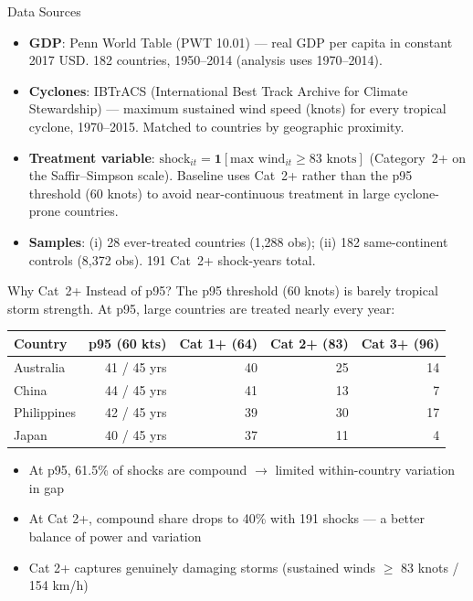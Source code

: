 \documentclass[aspectratio=169,c]{beamer}
\begin{document}
\begin{frame}{Data Sources}
\begin{itemize}
  \item \textbf{GDP}: Penn World Table (PWT 10.01) --- real GDP per capita in constant 2017 USD. 182 countries, 1950--2014 (analysis uses 1970--2014).

  \medskip
  \item \textbf{Cyclones}: IBTrACS (International Best Track Archive for Climate Stewardship) --- maximum sustained wind speed (knots) for every tropical cyclone, 1970--2015. Matched to countries by geographic proximity.

  \medskip
  \item \textbf{Treatment variable}: $\mathrm{shock}_{it} = \mathbf{1}[\text{max wind}_{it} \geq 83 \text{ knots}]$ (Category~2+ on the Saffir--Simpson scale). Baseline uses Cat~2+ rather than the p95 threshold (60 knots) to avoid near-continuous treatment in large cyclone-prone countries.

  \medskip
  \item \textbf{Samples}: (i) 28 ever-treated countries (1,288 obs); (ii) 182 same-continent controls (8,372 obs). 191 Cat~2+ shock-years total.
\end{itemize}
\end{frame}

\begin{frame}{Why Cat~2+ Instead of p95?}
The p95 threshold (60 knots) is barely tropical storm strength. At p95, large countries are treated nearly every year:

\centering
\smallskip
\begin{tabular}{l r r r r}
\hline
\textbf{Country} & \textbf{p95 (60 kts)} & \textbf{Cat 1+ (64)} & \textbf{Cat 2+ (83)} & \textbf{Cat 3+ (96)} \\
\hline
Australia    & 41 / 45 yrs & 40 & 25 & 14 \\
China        & 44 / 45 yrs & 41 & 13 & 7  \\
Philippines  & 42 / 45 yrs & 39 & 30 & 17 \\
Japan        & 40 / 45 yrs & 37 & 11 & 4  \\
\hline
\end{tabular}

\smallskip
\small
\begin{itemize}
  \item At p95, 61.5\% of shocks are compound $\to$ limited within-country variation in gap
  \item At Cat 2+, compound share drops to 40\% with 191 shocks --- a better balance of power and variation
  \item Cat 2+ captures genuinely damaging storms (sustained winds $\geq$ 83 knots / 154 km/h)
\end{itemize}
\end{frame}
\end{document}
